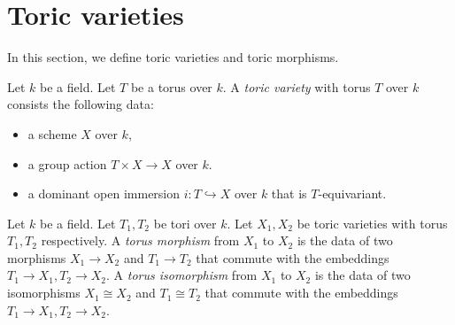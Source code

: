 \section{Toric varieties}


In this section, we define toric varieties and toric morphisms.


\begin{definition}
  \label{5-1-tor-var}
  \leanok

  Let $k$ be a field.
  Let $T$ be a torus over $k$.
  A \emph{toric variety} with torus $T$ over $k$ consists the following data:
  \begin{itemize}
    \item a scheme $X$ over $k$,
    \item a group action $T \times X \to X$ over $k$.
    \item a dominant open immersion $i : T \hookrightarrow X$ over $k$ that is $T$-equivariant.
  \end{itemize}
\end{definition}


\begin{definition}
  \label{5-1-tor-hom}
  \leanok

  Let $k$ be a field.
  Let $T_1, T_2$ be tori over $k$.
  Let $X_1, X_2$ be toric varieties with torus $T_1, T_2$ respectively.
  A \emph{torus morphism} from $X_1$ to $X_2$ is the data of two morphisms $X_1 \to X_2$ and
  $T_1 \to T_2$ that commute with the embeddings $T_1 \to X_1, T_2 \to X_2$.
  A \emph{torus isomorphism} from $X_1$ to $X_2$ is the data of two isomorphisms $X_1 \cong X_2$ and
  $T_1 \cong T_2$ that commute with the embeddings $T_1 \to X_1, T_2 \to X_2$.
\end{definition}
